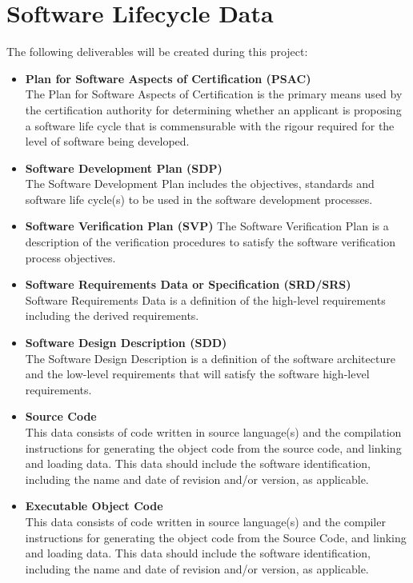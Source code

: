 \documentclass[11pt]{article}
\begin{document}
\section{Software Lifecycle Data}
The following deliverables will be created during this project:
\begin{itemize}
\item \textbf{Plan for Software Aspects of Certification (PSAC)} \\
The Plan for Software Aspects of Certification is the primary means used by the certification authority for determining whether an applicant is proposing a software life cycle that is commensurable with the rigour required for the level of software being developed.
\item \textbf{Software Development Plan (SDP)} \\
The Software Development Plan includes the objectives, standards and software life cycle(s) to be used in the software development processes.
\item \textbf{Software Verification Plan (SVP)}
The Software Verification Plan is a description of the verification procedures to satisfy the software verification process objectives.
\item \textbf{Software Requirements Data or Specification (SRD/SRS)} \\
Software Requirements Data is a definition of the high-level requirements including the derived requirements.
\item \textbf{Software Design Description (SDD)} \\
The Software Design Description is a definition of the software architecture and the low-level requirements that will satisfy the software high-level requirements.
\item \textbf{Source Code} \\
This data consists of code written in source language(s) and the compilation instructions for generating the object code from the source code, and linking and loading data. This data should include the software identification, including the name and date of revision and/or version, as applicable.
\item \textbf{Executable Object Code} \\
This data consists of code written in source language(s) and the compiler instructions for generating the object code from the Source Code, and linking and loading data. This data should include the software identification, including the name and date of revision and/or version, as applicable.

\end{itemize}
\end{document}
